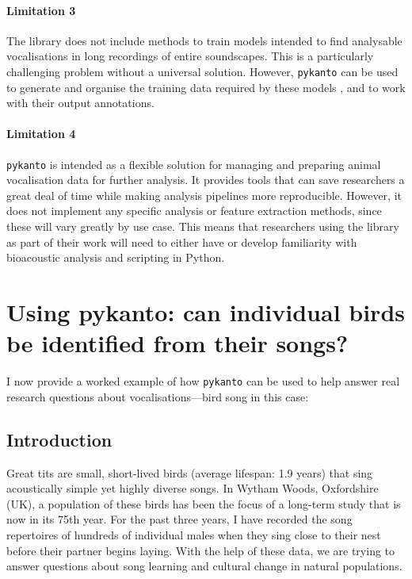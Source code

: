 \paragraph{Limitation 3} The library does not include methods to train models intended to
find analysable vocalisations in long recordings of entire soundscapes. This is
a particularly challenging problem \parencite{priyadarshani2018} without a universal
solution. However, \texttt{pykanto} can be used to generate and organise the training
data required by these models \parencite{kahl2021, stowell2019, stowell2014}, and to
work with their output annotations.

\paragraph{Limitation 4} \texttt{pykanto} is intended as a flexible solution for managing
and preparing animal vocalisation data for further analysis. It provides tools
that can save researchers a great deal of time while making analysis pipelines
more reproducible. However, it does not implement any specific analysis or
feature extraction methods, since these will vary greatly by use case. This
means that researchers using the library as part of their work will need to
either have or develop familiarity with bioacoustic analysis and scripting in
Python.

\section{Using pykanto: can individual birds be identified from their songs?}

I now provide a worked example of how \texttt{pykanto} can be used to help answer real research questions about vocalisations---bird song in this case:

\subsection{Introduction}

Great tits are small, short-lived birds (average lifespan: 1.9 years) that sing
acoustically simple yet highly diverse songs. In Wytham Woods, Oxfordshire (UK),
a population of these birds has been the focus of a long-term study that is now
in its 75th year. For the past three years, I have recorded the song repertoires of
hundreds of individual males when they sing close to their nest before their
partner begins laying. With the help of these data, we are trying to answer
questions about song learning and cultural change in natural populations.

